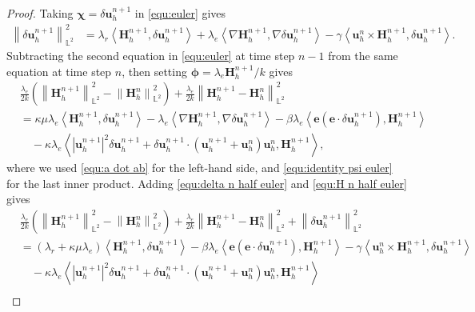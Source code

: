 \documentclass[11pt, reqno]{amsart}
\theoremstyle{definition}
\theoremstyle{remark}
\numberwithin{equation}{section}
\newcommand{\bff}{\boldsymbol}
\newcommand{\bb}{\mathbb}
\newcommand{\norm}[2]{\left\|{#1}\right\|_{#2}}
\newcommand{\inpro}[2]{\left\langle#1,#2\right\rangle}
\newcommand{\abs}[1]{\left|{#1}\right|}
\begin{document}
\begin{proof}
Taking $\bff{\chi}=\delta \bff{u}_h^{n+1}$ in \eqref{equ:euler} gives
	\begin{align}\label{equ:delta n half euler}
		\norm{\delta \bff{u}_h^{n+1}}{\bb{L}^2}^2
		&=
		\lambda_r \inpro{\bff{H}_h^{n+1}}{\delta \bff{u}_h^{n+1}}
		+
		\lambda_e \inpro{\nabla \bff{H}_h^{n+1}}{\nabla \delta \bff{u}_h^{n+1}}
		-
		\gamma \inpro{\bff{u}_h^{n} \times \bff{H}_h^{n+1}}{\delta \bff{u}_h^{n+1}}.
	\end{align}
	Subtracting the second equation in \eqref{equ:euler} at time step $n-1$ from the same equation at time step $n$, then setting $\bff{\phi}= \lambda_e \bff{H}_h^{n+1}/k$ gives
	\begin{align}\label{equ:H n half euler}
		\nonumber
		&\frac{\lambda_e}{2k} \left( \norm{\bff{H}_h^{n+1}}{\bb{L}^2}^2 - \norm{\bff{H}_h^n}{\bb{L}^2}^2 \right)
		+
		\frac{\lambda_e}{2k} \norm{\bff{H}_h^{n+1}-\bff{H}_h^n}{\bb{L}^2}^2
		\\
		\nonumber
		&=
		\kappa\mu \lambda_e \inpro{\bff{H}_h^{n+1}}{\delta \bff{u}_h^{n+1}}
		-
		\lambda_e \inpro{\nabla \bff{H}_h^{n+1}}{\nabla \delta \bff{u}_h^{n+1}}
		-
		\beta\lambda_e \inpro{\bff{e}(\bff{e}\cdot \delta \bff{u}_h^{n+1})}{\bff{H}_h^{n+1}}
		\\
		&\quad 
		-
		\kappa \lambda_e \inpro{\abs{\bff{u}_h^{n+1}}^2 \delta\bff{u}_h^{n+1} + \delta\bff{u}_h^{n+1} \cdot (\bff{u}_h^{n+1}+\bff{u}_h^n) \bff{u}_h^n}{\bff{H}_h^{n+1}},
	\end{align}
	where we used \eqref{equ:a dot ab} for the left-hand side, and \eqref{equ:identity psi euler} for the last inner product. Adding \eqref{equ:delta n half euler} and \eqref{equ:H n half euler} gives
	\begin{align*}
		&\frac{\lambda_e}{2k} \left( \norm{\bff{H}_h^{n+1}}{\bb{L}^2}^2 - \norm{\bff{H}_h^n}{\bb{L}^2}^2 \right)
		+
		\frac{\lambda_e}{2k} \norm{\bff{H}_h^{n+1}-\bff{H}_h^n}{\bb{L}^2}^2
		+
		\norm{\delta \bff{u}_h^{n+1}}{\bb{L}^2}^2
		\\
		&=
		(\lambda_r+\kappa\mu \lambda_e) \inpro{\bff{H}_h^{n+1}}{\delta \bff{u}_h^{n+1}}
		-
		\beta\lambda_e \inpro{\bff{e}(\bff{e}\cdot \delta \bff{u}_h^{n+1})}{\bff{H}_h^{n+1}}
		-
		\gamma \inpro{\bff{u}_h^{n} \times \bff{H}_h^{n+1}}{\delta \bff{u}_h^{n+1}}
		\\
		&\quad
		-
		\kappa \lambda_e \inpro{\abs{\bff{u}_h^{n+1}}^2 \delta\bff{u}_h^{n+1} + \delta\bff{u}_h^{n+1} \cdot (\bff{u}_h^{n+1}+\bff{u}_h^n) \bff{u}_h^n}{\bff{H}_h^{n+1}}
		\\

\end{align*}
\end{proof}
\end{document}
